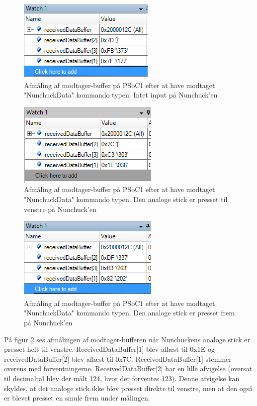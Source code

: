 \begin{figure}[H]
	\centering
	\includegraphics[width=.5\textwidth]{Test/images/I2CProtocolReadNoInput.png}
	\caption{Afmåling af modtager-buffer på PSoC1 efter at have modtaget "NunchuckData" kommando typen. Intet input på Nunchuck'en}
	\label{fig:I2CProtocolReadNoInput}
\end{figure}

\begin{figure}[H]
	\centering
	\includegraphics[width=.5\textwidth]{Test/images/I2CProtocolReadLeftAnalog.png}
	\caption{Afmåling af modtager-buffer på PSoC1 efter at have modtaget "NunchuckData" kommando typen. Den analoge stick er presset til venstre på Nunchuck'en}
	\label{fig:I2CProtocolReadLeftAnalog}
\end{figure}

\begin{figure}[H]
	\centering
	\includegraphics[width=.5\textwidth]{Test/images/I2CProtocolReadUpAnalog.png}
	\caption{Afmåling af modtager-buffer på PSoC1 efter at have modtaget "NunchuckData" kommando typen. Den analoge stick er presset frem på Nunchuck'en}
	\label{fig:I2CProtocolReadUpAnalog}
\end{figure}

På figur \ref{fig:I2CProtocolReadLeftAnalog} ses afmålingen af modtager-bufferen når Nunchuckens analoge stick er presset helt til venstre. ReceivedDataBuffer[1] blev aflæst til 0x1E og receivedDataBuffer[2] blev aflæst til 0x7C. ReceivedDataBuffer[1] stemmer overens med forventningerne. ReceivedDataBuffer[2] har en lille afvigelse (oversat til decimaltal blev der målt 124, hvor der forventes 123). Denne afvigelse kan skyldes, at det analoge stick ikke blev presset direkte til venstre, men at den også er blevet presset en smule frem under målingen.

